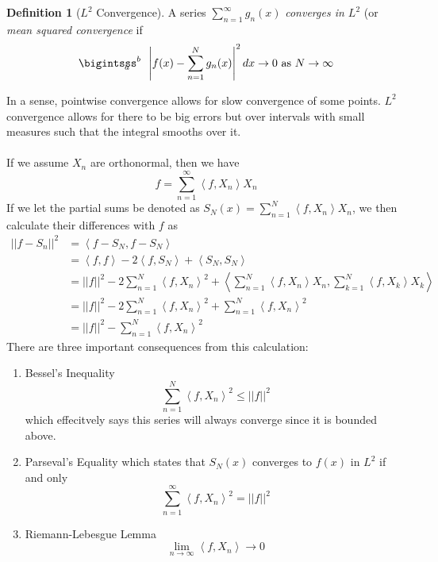\documentclass{article}
\newcommand{\ip}[2]{\left\langle #1,#2\right\rangle}
\theoremstyle{definition}
\newtheorem{definition}[theorem]{Definition}
\begin{document}
\begin{definition}[$L^2$ Convergence]
    A series $\displaystyle{\sum^\infty_{n=1}g_n(x)}$ \emph{converges in $L^2$} (or \emph{mean squared convergence} if 
    \begin{equation*}
        \bigintsss
        ^b_{\!\!\!\!\!\!\!\!a}\,\,\,\left|f(x)-\sum^N_{n=1}g_n(x)\right|^2dx \to 0 \text{ as } N\to \infty
    \end{equation*}
\end{definition}
In a sense, pointwise convergence allows for slow convergence of some points. $L^2$ convergence allows for there to be big errors but over intervals with small measures such that the integral smooths over it.\\\\
If we assume $X_n$ are orthonormal, then we have 
\begin{equation*}
    f = \sum^\infty_{n=1}\ip{f}{X_n}X_n
\end{equation*}
If we let the partial sums be denoted as $S_N(x)=\displaystyle{\sum^N_{n=1}\ip{f}{X_n}{X_n}}$, we then calculate their differences with $f$ as 
\begin{equation*}
    \begin{split}
        ||f-S_n||^2 &= \ip{f-S_N}{f-S_N} \\
        &= \ip{f}{f}-2\ip{f}{S_N}+\ip{S_N}{S_N} \\
        &= ||f||^2-2\sum^N_{n=1}\ip{f}{X_n}^2 + \ip{\sum^N_{n=1}\ip{f}{X_n}X_n}{\sum^N_{k=1}\ip{f}{X_k}X_k} \\
        &= ||f||^2-2\sum^N_{n=1} \ip{f}{X_n}^2+\sum^N_{n=1}\ip{f}{X_n}^2 \\
        &=||f||^2-\sum^N_{n=1}\ip{f}{X_n}^2
    \end{split}
\end{equation*}
There are three important consequences from this calculation:
\begin{enumerate}
    \item Bessel's Inequality
    \begin{equation*}
        \sum^N_{n=1} \ip{f}{X_n}^2 \leq ||f||^2
    \end{equation*}
    which effecitvely says this series will always converge since it is bounded above.
    \item Parseval's Equality which states that $S_N(x)$ converges to $f(x)$ in $L^2$ if and only 
    \begin{equation*}
        \sum^\infty_{n=1}\ip{f}{X_n}^2 = ||f||^2
    \end{equation*}
    \item Riemann-Lebesgue Lemma 
    \begin{equation*}
        \lim_{n\to \infty} \ip{f}{X_n} \to 0
    \end{equation*}
\end{enumerate}
\end{document}
